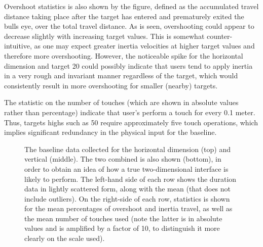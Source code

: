 Overshoot statistics is also shown by the figure, defined as the accumulated travel distance taking place after the target has entered and prematurely exited the bulls eye, over the total travel distance. As is seen, overshooting could appear to decrease slightly with increasing target values. This is somewhat counter-intuitive, as one may expect greater inertia velocities at higher target values and therefore more overshooting. However, the noticeable spike for the horizontal dimension and target 20 could possibly indicate that users tend to apply inertia in a very rough and invariant manner regardless of the target, which would consistently result in more overshooting for smaller (nearby) targets.

The statistic on the number of touches (which are shown in absolute values  rather than percentage) indicate that user's perform a touch for every 0.1 meter. Thus, targets highs such as 50 require approximately five touch operations, which implies significant redundancy in the physical input for the baseline. 

%
%




\begin{figure*}[!ht]
	\centering
	\caption{The baseline data collected for the horizontal dimension (top) and vertical (middle). The two combined is also shown (bottom), in order to obtain an idea of how a true two-dimensional interface is likely to perform. The left-hand side of each row shows the duration data in lightly scattered form, along with the mean (that does not include outliers). On the right-side of each row, statistics is shown for the mean percentages of overshoot and inertia travel, as well as the mean number of touches used (note the latter is in absolute values and is amplified by a factor of 10, to distinguish it more clearly on the scale used).}
	\label{fig:expOneBaselineData}
\end{figure*}



